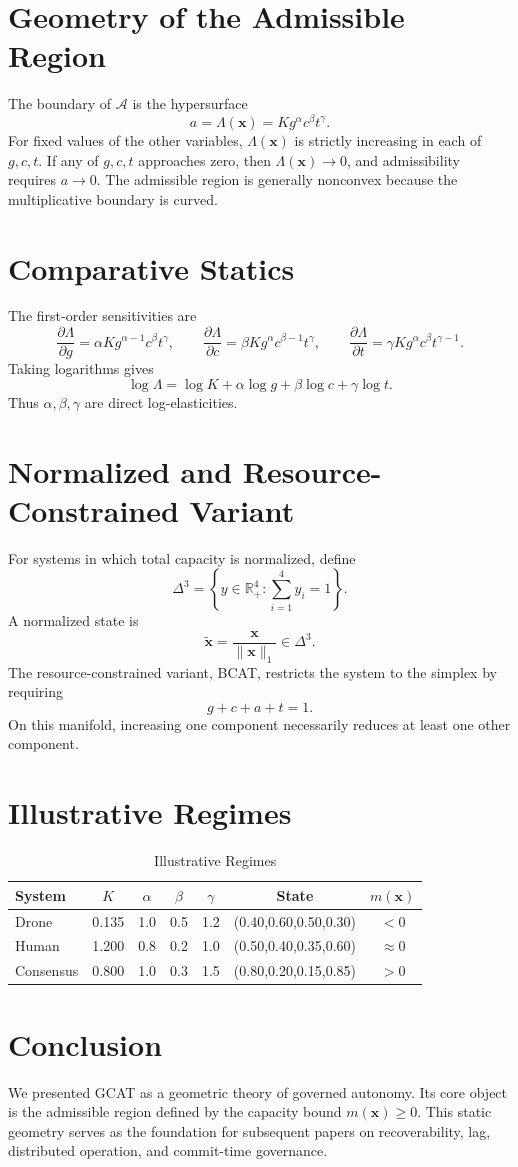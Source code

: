 \documentclass[letterpaper,10pt,conference]{ieeeconf}
\newcommand{\x}{\mathbf{x}}
\newcommand{\xt}{\tilde{\mathbf{x}}}
\newcommand{\A}{\mathcal{A}}
\newcommand{\Lam}{\Lambda}
\begin{document}
\section{Geometry of the Admissible Region}
The boundary of $\A$ is the hypersurface
\[
a=\Lam(\x)=K g^\alpha c^\beta t^\gamma.
\]
For fixed values of the other variables, $\Lam(\x)$ is strictly increasing in each of $g,c,t$. If any of $g,c,t$ approaches zero, then $\Lam(\x)\to 0$, and admissibility requires $a\to 0$. The admissible region is generally nonconvex because the multiplicative boundary is curved.
\section{Comparative Statics}
The first-order sensitivities are
\[
\frac{\partial \Lam}{\partial g}=\alpha K g^{\alpha-1}c^\beta t^\gamma,\qquad
\frac{\partial \Lam}{\partial c}=\beta K g^\alpha c^{\beta-1}t^\gamma,\qquad
\frac{\partial \Lam}{\partial t}=\gamma K g^\alpha c^\beta t^{\gamma-1}.
\]
Taking logarithms gives
\[
\log \Lam=\log K+\alpha\log g+\beta\log c+\gamma\log t.
\]
Thus $\alpha,\beta,\gamma$ are direct log-elasticities.
\section{Normalized and Resource-Constrained Variant}
For systems in which total capacity is normalized, define
\[
\Delta^3=\left\{y\in\mathbb{R}^4_+:\sum_{i=1}^4 y_i=1\right\}.
\]
A normalized state is
\[
\xt=\frac{\x}{\|\x\|_1}\in\Delta^3.
\]
The resource-constrained variant, BCAT, restricts the system to the simplex by requiring
\[
g+c+a+t=1.
\]
On this manifold, increasing one component necessarily reduces at least one other component.
\section{Illustrative Regimes}
\begin{table}[h]
\centering
\caption{Illustrative Regimes}
\begin{tabular}{lcccccc}
\hline
System & $K$ & $\alpha$ & $\beta$ & $\gamma$ & State & $m(\x)$ \\
\hline
Drone & 0.135 & 1.0 & 0.5 & 1.2 & (0.40,0.60,0.50,0.30) & $<0$ \\
Human & 1.200 & 0.8 & 0.2 & 1.0 & (0.50,0.40,0.35,0.60) & $\approx 0$ \\
Consensus & 0.800 & 1.0 & 0.3 & 1.5 & (0.80,0.20,0.15,0.85) & $>0$ \\
\hline
\end{tabular}
\end{table}
\section{Conclusion}
We presented GCAT as a geometric theory of governed autonomy. Its core object is the admissible region defined by the capacity bound $m(\x)\ge 0$. This static geometry serves as the foundation for subsequent papers on recoverability, lag, distributed operation, and commit-time governance.
\end{document}
